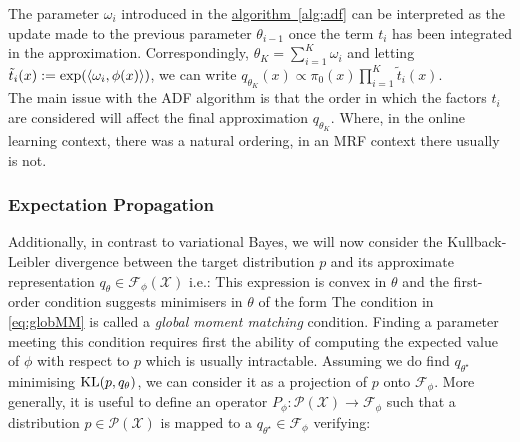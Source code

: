 The parameter $\omega_{i}$ introduced in the \hyperref[alg:adf]{algorithm~\ref*{alg:adf}} can be interpreted as the update made to the previous parameter $\theta_{i-1}$ once the term $t_{i}$ has been integrated in the approximation. Correspondingly, $\theta_{K}=\sum_{i=1}^{K}\omega_{i}$ and letting $\tilde t_{i}(x):=\exp(\left\langle \omega_{i},\phi(x) \right\rangle)$, we can write $q_{\theta_{K}}(x)\propto \pi_{0}(x)\prod_{i=1}^{K}\tilde t_{i}(x)$.\\
The main issue with the ADF algorithm is that the order in which the factors $t_{i}$ are considered will affect the final approximation $q_{\theta_{K}}$. Where, in the online learning context, there was a natural ordering, in an MRF context there usually is not.




%
\subsubsection*{Expectation Propagation}
%

\vspace*{2cm}
Additionally, in contrast to variational Bayes, we will now consider the Kullback-Leibler divergence between the target distribution $p$ and its approximate representation $q_{\theta}\in\mathcal F_{\phi}(\mathcal X)$ i.e.:
%
%
This expression is convex in $\theta$ and the first-order condition suggests minimisers in $\theta$ of the form
%
%
The condition in \eqref{eq:globMM} is called a \emph{global moment matching} condition. 
Finding a parameter meeting this condition requires first the ability of computing the expected value of $\phi$ with respect to $p$ which is usually intractable.
Assuming we do find $q_{\theta^{\star}}$ minimising $\mathrm{KL}\!\left(p,q_{\theta}\right)$, we can consider it as a projection of $p$ onto $\mathcal F_{\phi}$. More generally, it is useful to define an operator $P_{\phi}:\mathcal P(\mathcal X)\to\mathcal F_{\phi}$ such that a distribution $p\in\mathcal P(\mathcal X)$ is mapped to a $q_{\theta^{\star}}\in\mathcal F_{\phi}$ verifying:
%
%
